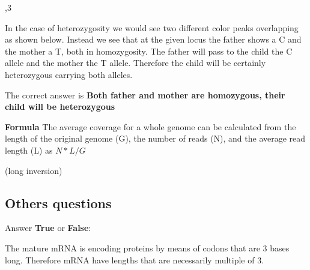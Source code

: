 \begin{Answer} [
   ref={ex16},
   number={16}
 ]

  ,3

In the case of heterozygosity we would see two different color peaks
overlapping as shown below.
Instead we see that at the given locus the father shows a C and the mother
a T, both in homozygosity.
The father will pass to the child the C allele and the mother the T allele.
Therefore the child will be certainly heterozygous carrying both alleles.

The correct answer is \textbf{Both father and mother are homozygous,
their child will be heterozygous}

\end{Answer}

\begin{Answer} [
   ref={ex17},
   number={17}
 ]


\textbf{Formula} The average coverage for a whole genome can be calculated
from the length of the original genome (G), the number of reads (N), and the
average read length (L) as $N*L/G$

\end{Answer}

\begin{Answer} [
   ref={ex18},
   number={18}
 ]


\end{Answer}

\begin{Answer} [
   ref={ex19},
   number={19}
 ]

   (long inversion)

\end{Answer}

\subsection{Others questions}

\begin{Exercise} [
  title={mRNA},
  difficulty={1},
  label={ex20},
  origin={G. Valle}
 ]

Answer \textbf{True} or \textbf{False}:

  \Question The mature mRNA is encoding proteins by means of codons that are
3 bases long. Therefore mRNA have lengths that are necessarily multiple of 3.

\end{Exercise}

